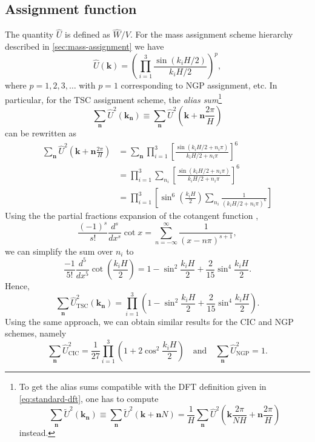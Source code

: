 \subsection{Assignment function}
The quantity $\hat{U}$ is defined as $\hat{W}/V$.
For the mass assignment scheme hierarchy described in \autoref{sec:mass-assignment} we have
\begin{equation*}
    \hat{U}(\mathbf{k}) = \left(\prod_{i=1}^{3}\frac{\sin(k_i H / 2)}{k_i H / 2}\right)^{p},
\end{equation*}
where $p=1,2,3,\dots$ with $p=1$ corresponding to NGP assignment, etc.
In particular, for the TSC assignment scheme, the \textit{alias sum}\footnote{
    To get the alias sums compatible with the DFT definition given in \autoref{eq:standard-dft}, one has to compute
    \begin{equation*}
        \sum_{\mathbf{n}} \tilde{U}^2(\mathbf{k}_\mathbf{n})
        \equiv \sum_\mathbf{n}\tilde{U}^2(\mathbf{k}+\mathbf{n}N)
        = \frac{1}{H}\sum_\mathbf{n}\hat{U}^2\left(\mathbf{k}\frac{2\pi}{NH}+\mathbf{n}\frac{2\pi}{H}\right)
    \end{equation*}
    instead.
}
\begin{equation*}
    \sum_{\mathbf{n}}\hat{U}^2(\mathbf{k}_\mathbf{n})
    \equiv \sum_{\mathbf{n}}\hat{U}^2\left(\mathbf{k} + \mathbf{n}\frac{2\pi}{H}\right)
\end{equation*}
can be rewritten as
\begin{align*}
    \sum_{\mathbf{n}} \hat{U}^2\left(\mathbf{k}+\mathbf{n}\frac{2\pi}{H}\right)
     & = \sum_{\mathbf{n}} \prod_{i=1}^{3} \left[ \frac{\sin(k_i H/2 + n_i\pi)}{k_i H/2 + n_i\pi} \right]^6 \\
     & = \prod_{i=1}^{3} \sum_{n_i} \left[ \frac{\sin(k_i H/2 + n_i \pi)}{k_i H/2 + n_i \pi} \right]^6      \\
     & = \prod_{i=1}^{3} \left[ \sin^6\left(\frac{k_i H}{2}\right)
        \sum_{n_i} \frac{1}{(k_i H/2 + n_i \pi)^6} \right]
\end{align*}
Using the the partial fractions expansion of the cotangent function \cite{aigner2018proofs},
\begin{equation*}
    \frac{(-1)^s}{s!}\frac{d^s}{dx^s}\cot x = \sum_{n=-\infty}^{\infty} \frac{1}{(x-n\pi)^{s+1}},
\end{equation*}
we can simplify the sum over $n_i$ to
\begin{equation*}
    \frac{-1}{5!} \frac{d^5}{dx^5}\cot\left( \frac{k_i H}{2} \right)
    = 1 - \sin^2\frac{k_i H}{2} + \frac{2}{15}\sin^4\frac{k_i H}{2}.
\end{equation*}
Hence,
\begin{equation*}
    \sum_{\mathbf{n}}\hat{U}_\text{TSC}^2(\mathbf{k}_\mathbf{n})
    = \prod_{i=1}^{3} \left(1 - \sin^2\frac{k_i H}{2} + \frac{2}{15}\sin^4\frac{k_i H}{2}\right).
\end{equation*}
Using the same approach, we can obtain similar results for the CIC and NGP schemes, namely
\begin{equation*}
    \sum_{\mathbf{n}}\hat{U}_\text{CIC}^2 = \frac{1}{27} \prod_{i=1}^{3} \left(1 + 2\cos^2\frac{k_i H}{2}\right)
    \quad \text{and} \quad
    \sum_{\mathbf{n}}\hat{U}_\text{NGP}^2 = 1.
\end{equation*}

